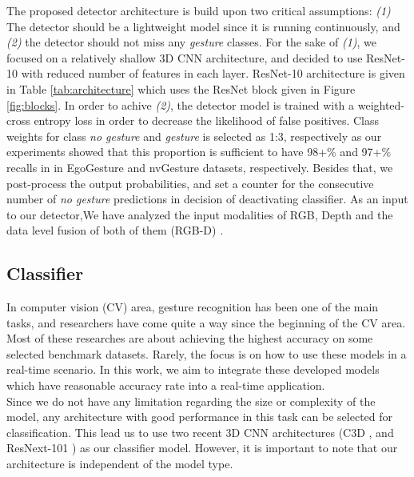 
The proposed detector architecture is build upon two critical assumptions: \textit{(1)} The detector should be a lightweight model since it is running continuously, and \textit{(2)} the detector should not miss any \textit{gesture} classes. For the sake of \textit{(1)}, we focused on a relatively shallow 3D CNN architecture, and decided to use ResNet-10 with reduced number of features in each layer. ResNet-10 architecture is given in Table \ref{tab:architecture} which uses the ResNet block given in Figure \ref{fig:blocks}. In order to achive \textit{(2)}, the detector model is trained with a weighted-cross entropy loss in order to decrease the likelihood of false positives. Class weights for class \textit{no gesture} and \textit{gesture} is selected as 1:3, respectively as our experiments showed that this proportion is sufficient to have 98+\% and 97+\% recalls in in EgoGesture and nvGesture datasets, respectively. Besides that, we post-process the output probabilities, and set a counter for the consecutive number of \textit{no gesture} predictions in decision of deactivating classifier. As an input to our detector,We have analyzed the input modalities of RGB, Depth and the data level fusion of both of them (RGB-D) \cite{kopuklu2018motion}. \\
\subsection{Classifier}
\label{subsec:classifier}
In computer vision (CV) area, gesture recognition has been one of the main tasks, and researchers have come quite a way since the beginning of the CV area. Most of these researches are about achieving the highest accuracy on some selected benchmark datasets.  Rarely,  the focus is on how to use these models in a real-time scenario.  In this work, we aim to integrate these developed models which have reasonable accuracy rate into a real-time application.\\

Since we do not have any limitation regarding the size or complexity of the model, any architecture with good performance in this task can be selected for classification.  This lead us to use two recent 3D CNN architectures (C3D \cite{tran_learning_2014}, and ResNext-101 \cite{he_deep_2015}) as our classifier model.  However, it is important to note that our architecture is independent of the model type.\\

